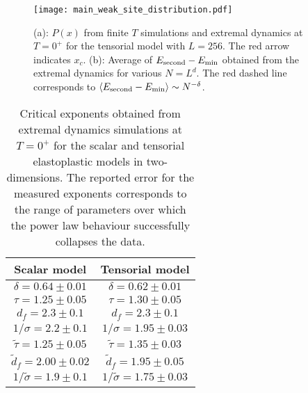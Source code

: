 \documentclass[pre,twocolumn,superscriptaddress,tightenlines,showpacs,longbibliography,floatfix,footinbib]{revtex4-1}
\begin{document}
\begin{figure}
\centering
\texttt{[image: main\_weak\_site\_distribution.pdf]}
\caption{(a): $P(x)$ from finite $T$ simulations and extremal dynamics at $T=0^+$ for the tensorial model with $L=256$. The red arrow indicates $x_c$.
(b): Average of $E_{\rm second}-E_{\rm min}$ obtained from the extremal dynamics for various $N=L^d$. The red dashed line corresponds to $\langle E_{\rm second}-E_{\rm min} \rangle \sim N^{-\delta}$.}
\label{fig:main_weak_site_distribution}
\end{figure}


\begin{table}
\begin{ruledtabular}
\caption{Critical exponents obtained from extremal dynamics simulations at $T=0^+$ for the scalar and tensorial elastoplastic models in two-dimensions. The reported error for the measured exponents corresponds to the range of parameters over which the power law behaviour successfully collapses the data.}
\label{tab:critical_exponents}
\begin{tabular}{cc}
Scalar model & Tensorial model
\\ \hline 
$\delta = 0.64 \pm 0.01$ & $\delta = 0.62 \pm 0.01$ \\


$\tau = 1.25 \pm 0.05$  & $\tau = 1.30 \pm 0.05$  \\
$d_f = 2.3 \pm 0.1$  & $d_f = 2.3 \pm 0.1$  \\
$1/\sigma = 2.2 \pm 0.1$  & $1/\sigma = 1.95 \pm 0.03$  \\


$\tilde \tau = 1.25 \pm 0.05$  & $\tilde \tau = 1.35 \pm 0.03$  \\
$\tilde d_f = 2.00 \pm 0.02$  & $\tilde d_f = 1.95 \pm 0.05$  \\
$1/\tilde \sigma = 1.9 \pm 0.1$  & $1/\tilde \sigma = 1.75 \pm 0.03$  \\



\end{tabular}
\end{ruledtabular}
\end{table}
\end{document}
